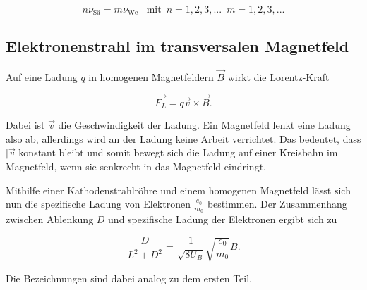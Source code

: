 \begin{equation}
  n \nu_\text{Sä} = m \nu_\text{We} \,\,\,\,\, \text{mit} \, \, \, n=1, 2, 3, ... \, \, \, m=1, 2, 3, ...
  \label{eq:2}
\end{equation}


\subsection{Elektronenstrahl im transversalen Magnetfeld}

Auf eine Ladung $q$ in homogenen Magnetfeldern $\vec{B}$ wirkt die Lorentz-Kraft

\begin{equation*}
  \vec{F_L} = q \vec{v} \times \vec{B}.
\end{equation*}

Dabei ist $\vec{v}$ die Geschwindigkeit der Ladung. Ein Magnetfeld lenkt eine Ladung
also ab, allerdings wird an der Ladung keine Arbeit verrichtet. Das bedeutet, dass
$\vert{\vec{v}}$ konstant bleibt und somit bewegt sich die Ladung auf einer Kreisbahn im Magnetfeld,
wenn sie senkrecht in das Magnetfeld eindringt.

Mithilfe einer Kathodenstrahlröhre und einem homogenen Magnetfeld lässt sich nun die
spezifische Ladung von Elektronen $\frac{e_0}{m_0}$ bestimmen. Der Zusammenhang zwischen
Ablenkung $D$ und spezifische Ladung der Elektronen ergibt sich zu

\begin{equation}
  \frac{D}{L^2 + D^2} = \frac{1}{\sqrt{8 U_B}} \sqrt{\frac{e_0}{m_0}} B.
  \label{eq:3}
\end{equation}

Die Bezeichnungen sind dabei analog zu dem ersten Teil.
